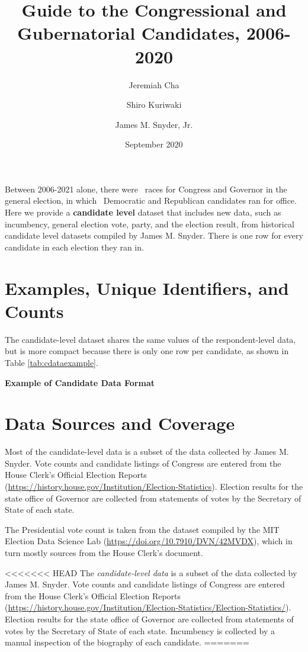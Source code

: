 \documentclass[12pt]{article}
\title{\large\textbf{Guide to the Congressional and Gubernatorial Candidates, 2006-2020}}
\author[1]{\normalsize Jeremiah Cha}
\author[2]{\normalsize Shiro Kuriwaki}
\author[1]{\normalsize James M. Snyder, Jr.}
\affil[1]{\footnotesize Department of Government, Harvard University.}
\affil[2]{\footnotesize To be Department of Political Science, Yale University}
\date{\normalsize September 2020}
\begin{document}
\maketitle 

Between 2006-2021 alone, there were \unskip \ races for Congress and Governor in the general election, in which \unskip \ Democratic and Republican candidates ran for office.  Here we provide a \textbf{candidate level} dataset that includes new data, such as incumbency, general election vote, party, and the election result, from historical candidate level datasets compiled by James M. Snyder. There is one row for every candidate in each election they ran in. 


\section{Examples, Unique Identifiers, and Counts}

The candidate-level dataset shares the same values of the respondent-level data, but is more compact because there is only one row per candidate, as shown in Table \ref{tab:cdataexample}.

\begin{table}[!h]
\caption{\textbf{Example of Candidate Data Format} \label{tab:cdataexample}}
\centering
\footnotesize

\end{table}

\section{Data Sources and Coverage}

Most of the candidate-level data is a subset of the data collected by James M. Snyder. Vote counts and candidate listings of Congress are entered from the House Clerk's Official Election Reports (\url{https://history.house.gov/Institution/Election-Statistics}).  Election results for the state office of Governor are collected from statements of votes by the Secretary of State of each state.

The Presidential vote count is taken from the dataset compiled by the MIT Election Data Science Lab (\url{https://doi.org/10.7910/DVN/42MVDX}), which in turn mostly sources from the House Clerk's document.

<<<<<<< HEAD
The \emph{candidate-level data} is a subset of the data collected by James M. Snyder. Vote counts and candidate listings of Congress are entered from the House Clerk's Official Election Reports (\url{https://history.house.gov/Institution/Election-Statistics/Election-Statistics/}).  Election results for the state office of Governor are collected from statements of votes by the Secretary of State of each state.  Incumbency is collected by a manual inspection of the biography of each candidate. 
=======
\end{document}
